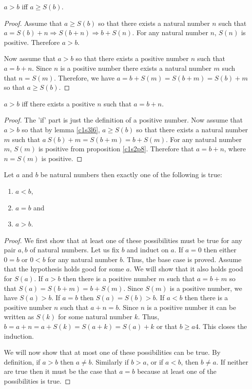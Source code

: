 \begin{lem}\label{c1s3l5}
$a > b$ iff $a \ge S(b)$.
\end{lem}
\begin{proof}
Assume that $a \ge S(b)$ so that there exists a natural number $n$ such 
that $a = S(b) + n \Rightarrow S(b + n) \Rightarrow b + S(n)$. For any 
natural number $n$, $S(n)$ is positive. Therefore $a > b$.

Now assume that $a > b$ so that there exists a positive number $n$ such that
$a = b + n$. Since $n$ is a positive number there exists a natural number
$m$ such that $n = S(m)$. Therefore, we have $a = b + S(m) = S(b + m) = 
S(b) + m$ so that $a \ge S(b)$.
\end{proof}

\begin{lem}\label{c1s3l6}
$a > b$ iff there exists a positive $n$ such that $a = b + n$.
\end{lem}
\begin{proof}
The 'if' part is just the definition of a positive number. Now assume that
$a > b$ so that by lemma \ref{c1s3l6}, $a \ge S(b)$ so that there exists 
a natural number $m$ such that $a \ S(b) + m = S(b + m) = b + S(m)$. For 
any natural number $m$, $S(m)$ is positive from proposition \ref{c1s2p8}.
Therefore that $a = b + n$, where $n =S(m)$ is positive.
\end{proof}

\begin{thm}\label{c1s3t1}
Let $a$ and $b$ be natural numbers then exactly one of the following is 
true:
\begin{enumerate}
\item $a < b$,
\item $a = b$ and
\item $a > b$.
\end{enumerate}
\end{thm}
\begin{proof}
We first show that at least one of these possibilities must be true for 
any pair $a, b$ of natural numbers. Let us fix $b$ and induct on $a$. If
$a = 0$ then either $0 = b$ or $0 < b$ for any natural number $b$. Thus, 
the base case is proved. Assume that the hypothesis holds good for some $a$.
We will show that it also holds good for $S(a)$. If $a > b$ then there is a
positive number $m$ such that $a = b + m$ so that $S(a) = S(b + m) = b +
S(m)$. Since $S(m)$ is a positive number, we have $S(a) > b$. If $a = b$ 
then $S(a) = S(b) > b$. If $a < b$ then there is a positive number $n$
such that $a + n = b$. Since $n$ is a positive number it can be written as
$S(k)$ for some natural number $k$. Thus, $b = a + n = a + S(k) = S(a + k)
= S(a) + k$ or that $b \ge a4$. This closes the induction.

We will now show that at most one of these possibilities can be true. By
definition, if $a > b$ then $a \ne b$. Similarly if $b > a$, or if $a < b$,
then $b \ne a$. If neither are true then it must be the case that $a = b$ 
because at least one of the possibilities is true.
\end{proof}

